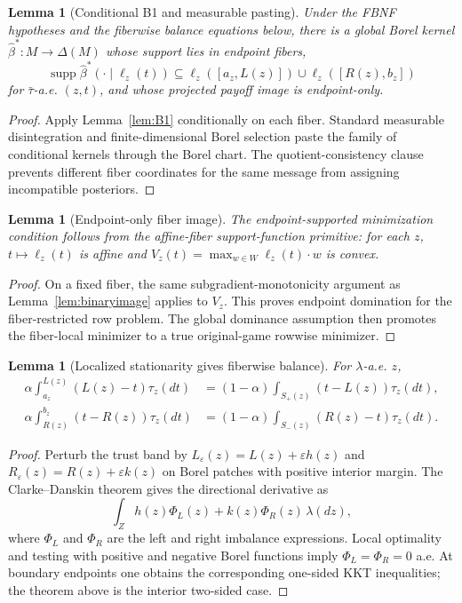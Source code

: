 \documentclass[11pt]{article}
\newtheorem{lemma}[theorem]{Lemma}
\theoremstyle{definition}
\theoremstyle{remark}
\newcommand{\eps}{\varepsilon}
\newcommand{\suppset}{\operatorname{supp}}
\begin{document}
\begin{lemma}[Conditional B1 and measurable pasting]\label{lem:F1}
Under the FBNF hypotheses and the fiberwise balance equations below, there is a global Borel kernel $\hat\beta^*:M\to\Delta(M)$ whose support lies in endpoint fibers,
\[
  \suppset\hat\beta^*(\cdot\mid\ell_z(t))
  \subseteq \ell_z([a_z,L(z)])\cup\ell_z([R(z),b_z])
\]
for $\bar\tau$-a.e. $(z,t)$, and whose projected payoff image is endpoint-only.
\end{lemma}

\begin{proof}
Apply Lemma~\ref{lem:B1} conditionally on each fiber. Standard measurable disintegration and finite-dimensional Borel selection paste the family of conditional kernels through the Borel chart. The quotient-consistency clause prevents different fiber coordinates for the same message from assigning incompatible posteriors.
\end{proof}

\begin{lemma}[Endpoint-only fiber image]\label{lem:F2}
The endpoint-supported minimization condition follows from the affine-fiber support-function primitive: for each $z$, $t\mapsto\ell_z(t)$ is affine and $V_z(t)=\max_{w\in W}\ell_z(t)\cdot w$ is convex.
\end{lemma}

\begin{proof}
On a fixed fiber, the same subgradient-monotonicity argument as Lemma~\ref{lem:binaryimage} applies to $V_z$. This proves endpoint domination for the fiber-restricted row problem. The global dominance assumption then promotes the fiber-local minimizer to a true original-game rowwise minimizer.
\end{proof}

\begin{lemma}[Localized stationarity gives fiberwise balance]\label{lem:F3}
For $\lambda$-a.e. $z$,
\begin{align}
  \alpha\int_{a_z}^{L(z)}(L(z)-t)\tau_z(dt)
  &= (1-\alpha)\int_{S_+(z)}(t-L(z))\tau_z(dt),\label{eq:Fleft}\\
  \alpha\int_{R(z)}^{b_z}(t-R(z))\tau_z(dt)
  &= (1-\alpha)\int_{S_-(z)}(R(z)-t)\tau_z(dt).\label{eq:Fright}
\end{align}
\end{lemma}

\begin{proof}
Perturb the trust band by $L_\eps(z)=L(z)+\eps h(z)$ and $R_\eps(z)=R(z)+\eps k(z)$ on Borel patches with positive interior margin. The Clarke--Danskin theorem gives the directional derivative as
\[
  \int_Z h(z)\Phi_L(z)+k(z)\Phi_R(z)\,\lambda(dz),
\]
where $\Phi_L$ and $\Phi_R$ are the left and right imbalance expressions. Local optimality and testing with positive and negative Borel functions imply $\Phi_L=\Phi_R=0$ a.e. At boundary endpoints one obtains the corresponding one-sided KKT inequalities; the theorem above is the interior two-sided case.
\end{proof}
\end{document}
